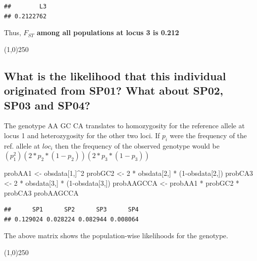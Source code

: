 \documentclass[]{article}
\newenvironment{Shaded}{\begin{snugshade}}{\end{snugshade}}
\newcommand{\DecValTok}[1]{\textcolor[rgb]{0.00,0.00,0.81}{{#1}}}
\newcommand{\StringTok}[1]{\textcolor[rgb]{0.31,0.60,0.02}{{#1}}}
\newcommand{\NormalTok}[1]{{#1}}
\begin{document}
\begin{verbatim}
##        L3 
## 0.2122762
\end{verbatim}

Thus, \textbf{$F_{ST}$ among all populations at locus 3 is 0.212}

\begin{center}
\line(1,0){250}
\end{center}

\subsection{What is the likelihood that this individual originated from
SP01? What about SP02, SP03 and
SP04?}\label{what-is-the-likelihood-that-this-individual-originated-from-sp01-what-about-sp02-sp03-and-sp04}

The genotype AA GC CA translates to homozygosity for the reference
allele at locus 1 and heterozygosity for the other two loci. If $p_{i}$
were the frequency of the ref. allele at $loc_{i}$ then the frequency of
the observed genotype would be $(p_1^2)(2*p_2*(1-p_2))(2*p_3*(1-p_3))$

\begin{Shaded}
\begin{Highlighting}[]
\NormalTok{probAA1 <-}\StringTok{ }\NormalTok{obsdata[}\DecValTok{1}\NormalTok{,]^}\DecValTok{2}  
\NormalTok{probGC2 <-}\StringTok{ }\DecValTok{2} \NormalTok{*}\StringTok{ }\NormalTok{obsdata[}\DecValTok{2}\NormalTok{,] *}\StringTok{ }\NormalTok{(}\DecValTok{1}\NormalTok{-obsdata[}\DecValTok{2}\NormalTok{,])}
\NormalTok{probCA3 <-}\StringTok{ }\DecValTok{2} \NormalTok{*}\StringTok{ }\NormalTok{obsdata[}\DecValTok{3}\NormalTok{,] *}\StringTok{ }\NormalTok{(}\DecValTok{1}\NormalTok{-obsdata[}\DecValTok{3}\NormalTok{,])}
\NormalTok{probAAGCCA <-}\StringTok{ }\NormalTok{probAA1 *}\StringTok{ }\NormalTok{probGC2 *}\StringTok{ }\NormalTok{probCA3}
\NormalTok{probAAGCCA}
\end{Highlighting}
\end{Shaded}

\begin{verbatim}
##      SP1      SP2      SP3      SP4 
## 0.129024 0.028224 0.082944 0.008064
\end{verbatim}

The above matrix shows the population-wise likelihoods for the genotype.

\begin{center}
\line(1,0){250}
\end{center}
\end{document}

